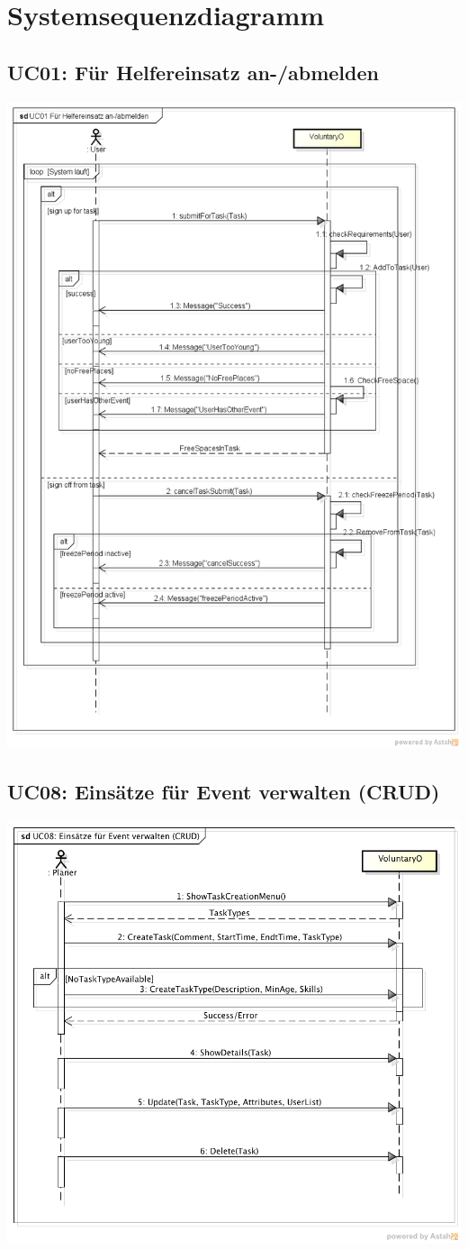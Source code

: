 \chapter{Systemsequenzdiagramm}
 \section{UC01: Für Helfereinsatz an-/abmelden}
 	\includegraphics[width=\textwidth]{content/domainanalyse/images/UC01_Fuer_Helfereinsatz_an_abmelden.png}


 \section{UC08: Einsätze für Event verwalten (CRUD)}
 	\includegraphics[width=\textwidth]{content/domainanalyse/images/UC08_Einsaetze_fuer_Event_verwalten.png}
